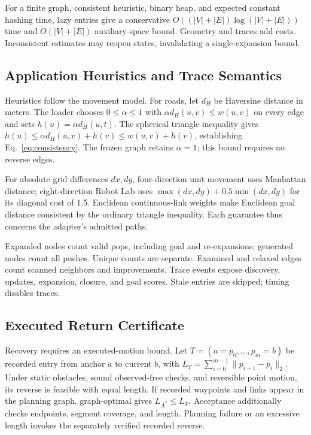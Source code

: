 For a finite graph, consistent heuristic, binary heap, and expected constant hashing time, lazy entries give a conservative $O((|V|+|E|)\log(|V|+|E|))$ time and $O(|V|+|E|)$ auxiliary-space bound. Geometry and traces add costs. Inconsistent estimates may reopen states, invalidating a single-expansion bound.

\subsection{Application Heuristics and Trace Semantics}
Heuristics follow the movement model. For roads, let $d_H$ be Haversine distance in meters. The loader chooses $0\leq\alpha\leq1$ with $\alpha d_H(u,v)\leq w(u,v)$ on every edge and sets $h(u)=\alpha d_H(u,t)$. The spherical triangle inequality gives $h(u)\leq\alpha d_H(u,v)+h(v)\leq w(u,v)+h(v)$, establishing Eq.~\ref{eq:consistency}. The frozen graph retains $\alpha=1$; this bound requires no reverse edges.

For absolute grid differences $dx,dy$, four-direction unit movement uses Manhattan distance; eight-direction Robot Lab uses $\max(dx,dy)+0.5\min(dx,dy)$ for its diagonal cost of 1.5. Euclidean continuous-link weights make Euclidean goal distance consistent by the ordinary triangle inequality. Each guarantee thus concerns the adapter's admitted paths.

Expanded nodes count valid pops, including goal and re-expansions; generated nodes count all pushes. Unique counts are separate. Examined and relaxed edges count scanned neighbors and improvements. Trace events expose discovery, updates, expansion, closure, and goal scores. Stale entries are skipped; timing disables traces.

\subsection{Executed Return Certificate}
Recovery requires an executed-motion bound. Let $T=(a=p_0,\ldots,p_m=b)$ be recorded entry from anchor $a$ to current $b$, with $L_T=\sum_{i=0}^{m-1}\|p_{i+1}-p_i\|_2$. Under static obstacles, sound observed-free checks, and reversible point motion, its reverse is feasible with equal length. If recorded waypoints and links appear in the planning graph, graph-optimal \astar{} gives $L_{A^*}\leq L_T$. Acceptance additionally checks endpoints, segment coverage, and length. Planning failure or an excessive length invokes the separately verified recorded reverse.

